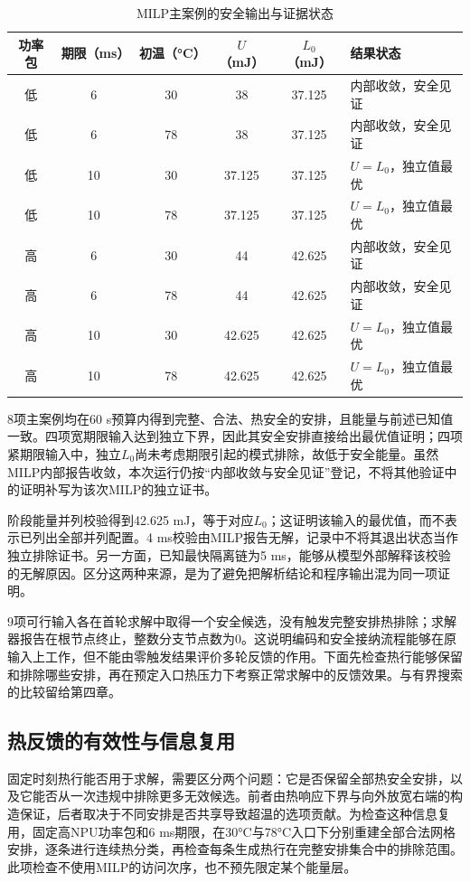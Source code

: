 \begin{table}[htbp]
\centering\small
\caption{MILP主案例的安全输出与证据状态}\label{tab:milp-results}
\begin{tabular}{cccccl}
\toprule
功率包 & 期限（ms） & 初温（°C） & $U$（mJ） & $L_0$（mJ） & 结果状态\\
\midrule
低 & 6 & 30 & 38 & 37.125 & 内部收敛，安全见证\\
低 & 6 & 78 & 38 & 37.125 & 内部收敛，安全见证\\
低 & 10 & 30 & 37.125 & 37.125 & $U=L_0$，独立值最优\\
低 & 10 & 78 & 37.125 & 37.125 & $U=L_0$，独立值最优\\
高 & 6 & 30 & 44 & 42.625 & 内部收敛，安全见证\\
高 & 6 & 78 & 44 & 42.625 & 内部收敛，安全见证\\
高 & 10 & 30 & 42.625 & 42.625 & $U=L_0$，独立值最优\\
高 & 10 & 78 & 42.625 & 42.625 & $U=L_0$，独立值最优\\
\bottomrule
\end{tabular}
\end{table}

8项主案例均在60 s预算内得到完整、合法、热安全的安排，且能量与前述已知值一致。四项宽期限输入达到独立下界，因此其安全安排直接给出最优值证明；四项紧期限输入中，独立$L_0$尚未考虑期限引起的模式排除，故低于安全能量。虽然MILP内部报告收敛，本次运行仍按“内部收敛与安全见证”登记，不将其他验证中的证明补写为该次MILP的独立证书。

阶段能量并列校验得到42.625 mJ，等于对应$L_0$；这证明该输入的最优值，而不表示已列出全部并列配置。4 ms校验由MILP报告无解，记录中不将其退出状态当作独立排除证书。另一方面，已知最快隔离链为5 ms，能够从模型外部解释该校验的无解原因。区分这两种来源，是为了避免把解析结论和程序输出混为同一项证明。

9项可行输入各在首轮求解中取得一个安全候选，没有触发完整安排热排除；求解器报告在根节点终止，整数分支节点数为0。这说明编码和安全接纳流程能够在原输入上工作，但不能由零触发结果评价多轮反馈的作用。下面先检查热行能够保留和排除哪些安排，再在预定入口热压力下考察正常求解中的反馈效果。与有界搜索的比较留给第四章。

\subsection{热反馈的有效性与信息复用}

固定时刻热行能否用于求解，需要区分两个问题：它是否保留全部热安全安排，以及它能否从一次违规中排除更多无效候选。前者由热响应下界与向外放宽右端的构造保证，后者取决于不同安排是否共享导致超温的选项贡献。为检查这种信息复用，固定高NPU功率包和6 ms期限，在30°C与78°C入口下分别重建全部合法网格安排，逐条进行连续热分类，再检查每条生成热行在完整安排集合中的排除范围。此项检查不使用MILP的访问次序，也不预先限定某个能量层。

